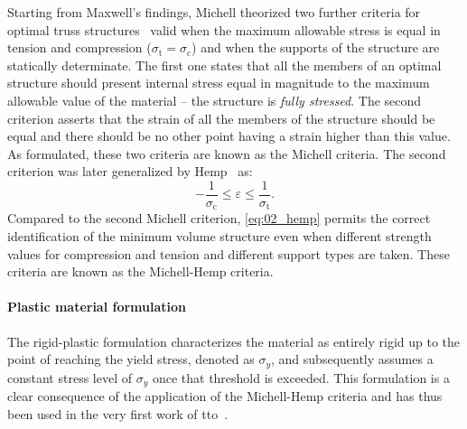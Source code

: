 Starting from Maxwell's findings, Michell theorized two further criteria for optimal truss structures~ valid when the maximum allowable stress is equal in tension and compression ($\sigma_\text{t} = \sigma_\text{c}$) and when the supports of the structure are statically determinate. The first one states that all the members of an optimal structure should present internal stress equal in magnitude to the maximum allowable value of the material -- \ie the structure is \textit{fully stressed}. The second criterion asserts that the strain of all the members of the structure should be equal and there should be no other point having a strain higher than this value. As formulated, these two criteria are known as the Michell criteria. The second criterion was later generalized by Hemp~ as:
\begin{equation} \label{eq:02_hemp}
    -\frac{1}{\sigma_\text{c}}\leq \varepsilon \leq \frac{1}{\sigma_\text{t}}.
\end{equation}
Compared to the second Michell criterion, \eqref{eq:02_hemp} permits the correct identification of the minimum volume structure even when different strength values for compression and tension and different support types are taken. These criteria are known as the Michell-Hemp criteria.

\paragraph{Plastic material formulation}
The rigid-plastic formulation characterizes the material as entirely rigid up to the point of reaching the yield stress, denoted as $\sigma_y$, and subsequently assumes a constant stress level of $\sigma_y$ once that threshold is exceeded. This formulation is a clear consequence of the application of the Michell-Hemp criteria and has thus been used in the very first work of \gls{tto}~. 

